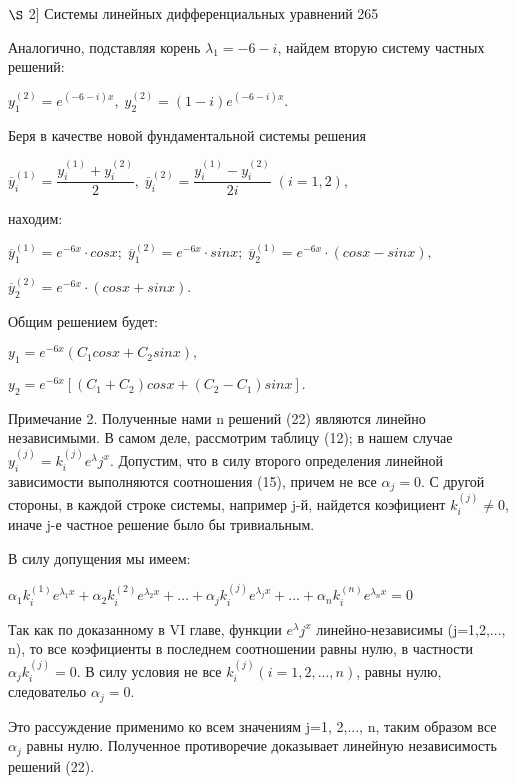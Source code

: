 \documentclass[11pt,a5paper,top=10mm]{book}
\begin{document}
	 \newpage
		$\S$
	  \hspace{1mm} 2]
	  \hspace{5mm}
	 Системы линейных дифференциальных уравнений \hspace{10mm} 265
	 
	 \medskip
	 Аналогично, подставляя корень $\lambda_1=-6-i$, найдем вторую систему частных решений:
	 \par
	 \hspace{10mm}
	 $y_1^{(2)}=e^{(-6-i)x}, \; y_2^{(2)}=(1-i)e^{(-6-i)x}$.
	 \par 
	 Беря в качестве новой фундаментальной системы решения
	
	\hspace{10mm}
	$ \overline{y}_i^{(1)}=\dfrac{y_i^{(1)}+y_i^{(2)}}{2}, \; \overline{y}_i^{(2)}=\dfrac{y_i^{(1)}-y_i^{(2)}}{2i} \; (i=1,2),$
	
	находим: 
	\par
	\hspace{3mm}
	$
	\overline{y}_1^{(1)}=e^{-6x} \cdot cosx; \;
	\overline{y}_1^{(2)}=e^{-6x}\cdot sinx; \;
	\overline{y}_2^{(1)}=e^{-6x}\cdot (cosx-sinx), \; $
	{\centering
		$
		 \overline{y}_2^{(2)}=e^{-6x} \cdot(cosx+sinx).
		$
		\par
	}	
	Общим решением будет:
	\par
	\hspace{10mm}
	$y_1=e^{-6x}(C_1 cosx + C_2 sinx),$
	\par
	\hspace{10mm}
	$
	y_2=e^{-6x} [(C_1+C_2)cosx+ (C_2 - C_1) sinx]. 
	$
	\par
	
	Примечание 2. Полученные нами n решений (22) являются линейно независимыми. В самом деле, рассмотрим таблицу (12); в нашем случае
	$y_i^{(j)}=k_i^{(j)}e^{\lambda}j^x.$
	Допустим, что в силу второго определения линейной зависимости выполняются соотношения (15), причем не все $\alpha_j=0$. С другой стороны, в каждой строке системы, например j-й, найдется коэфициент $k_i^{(j)} \neq 0$, иначе j-е частное решение было бы тривиальным.
	\par 
	В силу допущения мы имеем:
	\par
	$\alpha_1 k_i^{(1)} e^{\lambda_1 x} + \alpha_2 k_i^{(2)} e^{\lambda_2 x} + \dots + \alpha_j k_i^{(j)} e^{\lambda_j x} + \dots + \alpha_n k_i^{(n)} e^{\lambda_n x} = 0$
	\par
	Так как по доказанному в VI главе, функции $e^{\lambda} j^x$ линейно-независимы (j=1,2,..., n), то все коэфициенты в последнем соотношении равны нулю, в частности $\alpha_jk_i^{(j)}=0$.
	\newline
	В силу условия не все $k_i^{(j)} ( i= 1, 2,..., n)$, равны нулю, следовательо $\alpha_j=0.$
	\par 
	Это рассуждение применимо ко всем значениям j=1, 2,..., n, таким образом все $\alpha_j$ равны нулю. Полученное противоречие доказывает линейную независимость решений (22).
	\par
	
\end{document}
